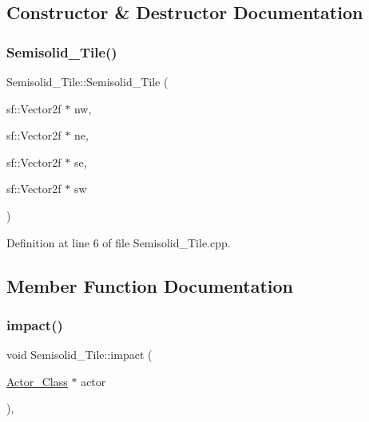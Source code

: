 \subsection{Constructor \& Destructor Documentation}
\hypertarget{class_semisolid___tile_a1fad2979b1c9d34e4311339f91e68149}{}\label{class_semisolid___tile_a1fad2979b1c9d34e4311339f91e68149} 
\subsubsection{\texorpdfstring{Semisolid\+\_\+\+Tile()}{Semisolid\_Tile()}}
{\footnotesize\ttfamily Semisolid\+\_\+\+Tile\+::\+Semisolid\+\_\+\+Tile (\begin{DoxyParamCaption}\item[{sf\+::\+Vector2f $\ast$}]{nw,  }\item[{sf\+::\+Vector2f $\ast$}]{ne,  }\item[{sf\+::\+Vector2f $\ast$}]{se,  }\item[{sf\+::\+Vector2f $\ast$}]{sw }\end{DoxyParamCaption})}



Definition at line 6 of file Semisolid\+\_\+\+Tile.\+cpp.



\subsection{Member Function Documentation}
\hypertarget{class_semisolid___tile_a65c8e43f414282be042b81c62fc63431}{}\label{class_semisolid___tile_a65c8e43f414282be042b81c62fc63431} 
\subsubsection{\texorpdfstring{impact()}{impact()}}
{\footnotesize\ttfamily void Semisolid\+\_\+\+Tile\+::impact (\begin{DoxyParamCaption}\item[{\hyperlink{class_actor___class}{Actor\+\_\+\+Class} $\ast$}]{actor }\end{DoxyParamCaption})\hspace{0.3cm}{\ttfamily [inline]}, {\ttfamily [virtual]}}



